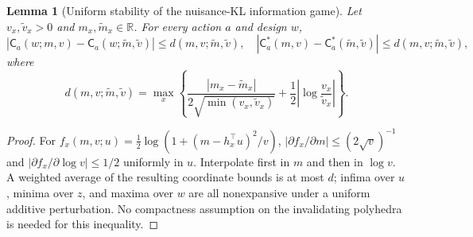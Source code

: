 \documentclass{article}
\theoremstyle{plain}
\newtheorem{lemma}[theorem]{Lemma}
\theoremstyle{definition}
\begin{document}
\begin{lemma}[Uniform stability of the nuisance-KL information game]
\label{lem:v34-transport}
Let $v_x,\widetilde v_x>0$ and $m_x,\widetilde m_x\in\mathbb R$.
For every action $a$ and design $w$,
\begin{equation}
 |\mathsf C_a(w;m,v)-\mathsf C_a(w;\widetilde m,\widetilde v)|
 \le d(m,v;\widetilde m,\widetilde v),\quad
 |\mathsf C_a^*(m,v)-\mathsf C_a^*(\widetilde m,\widetilde v)|
 \le d(m,v;\widetilde m,\widetilde v),
 \label{eq:v34-transport}
\end{equation}
where
\[
 d(m,v;\widetilde m,\widetilde v)=\max_x\left\{
 \frac{|m_x-\widetilde m_x|}{2\sqrt{\min(v_x,\widetilde v_x)}}+
 \frac12\left|\log\frac{v_x}{\widetilde v_x}\right|\right\}.
\]
\end{lemma}
\begin{proof}
For $f_x(m,v;u)=\frac12\log(1+(m-h_x^\top u)^2/v)$,
$|\partial f_x/\partial m|\le(2\sqrt v)^{-1}$ and
$|\partial f_x/\partial\log v|\le1/2$ uniformly in $u$.
Interpolate first in $m$ and then in $\log v$. A weighted average of
the resulting coordinate bounds is at most $d$; infima over $u$,
minima over $z$, and maxima over $w$ are all nonexpansive under a
uniform additive perturbation. No compactness assumption on the
invalidating polyhedra is needed for this inequality.
\end{proof}
\end{document}
